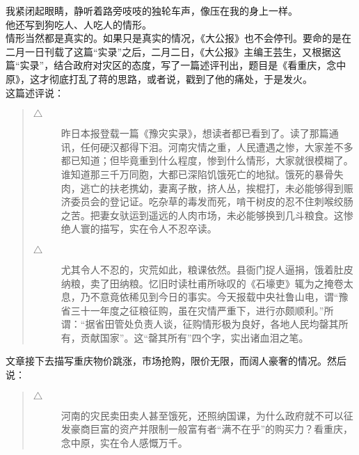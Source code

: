 我紧闭起眼睛，静听着路旁吱吱的独轮车声，像压在我的身上一样。\\

他还写到狗吃人、人吃人的情形。\\

情形当然都是真实的。如果只是真实的情况，《大公报》也不会停刊。要命的是在二月一日刊载了这篇“实录”之后，二月二日，《大公报》主编王芸生，又根据这篇“实录”，结合政府对灾区的态度，写了一篇述评刊出，题目是《看重庆，念中原》，这才彻底打乱了蒋的思路，或者说，戳到了他的痛处，于是发火。\\

这篇述评说：\\

\begin{quote}
	\begin{description}
	\item [$\bigtriangleup$] 昨日本报登载一篇《豫灾实录》，想读者都已看到了。读了那篇通讯，任何硬汉都得下泪。河南灾情之重，人民遭遇之惨，大家差不多都已知道；但毕竟重到什么程度，惨到什么情形，大家就很模糊了。谁知道那三千万同胞，大都已深陷饥饿死亡的地狱。饿死的暴骨失肉，逃亡的扶老携幼，妻离子散，挤人丛，挨棍打，未必能够得到赈济委员会的登记证。吃杂草的毒发而死，啃干树皮的忍不住刺喉绞肠之苦。把妻女驮运到遥远的人肉市场，未必能够换到几斗粮食。这惨绝人寰的描写，实在令人不忍卒读。\\
	
	\item [$\bigtriangleup$] 尤其令人不忍的，灾荒如此，粮课依然。县衙门捉人逼捐，饿着肚皮纳粮，卖了田纳粮。忆旧时读杜甫所咏叹的《石壕吏》辄为之掩卷太息，乃不意竟依稀见到今日的事实。今天报载中央社鲁山电，谓“豫省三十一年度之征粮征购，虽在灾情严重下，进行亦颇顺利。”所谓：“据省田管处负责人谈，征购情形极为良好，各地人民均罄其所有，贡献国家”。这“罄其所有”四个字，实出诸血泪之笔。\\
	\end{description}
\end{quote}


文章接下去描写重庆物价跳涨，市场抢购，限价无限，而阔人豪奢的情况。然后说：\\

\begin{quote}
	\begin{description}
		\item [$\bigtriangleup$] 河南的灾民卖田卖人甚至饿死，还照纳国课，为什么政府就不可以征发豪商巨富的资产并限制一般富有者“满不在乎”的购买力？看重庆，念中原，实在令人感慨万千。\\
	\end{description}
\end{quote}

